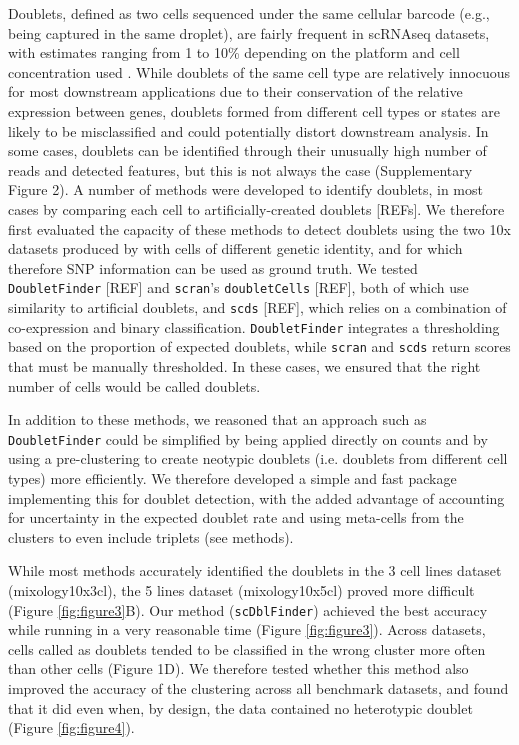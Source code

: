 \documentclass{bmcart}
\begin{document}
Doublets, defined as two cells sequenced under the same cellular barcode (e.g., being captured in the same droplet), are fairly frequent in scRNAseq datasets, with estimates ranging from 1 to 10\% depending on the platform and cell concentration used \citep{bloomEstimating2018,kangMultiplexedDemuxlet2018}. While doublets of the same cell type are relatively innocuous for most downstream applications due to their conservation of the relative expression between genes, doublets formed from different cell types or states are likely to be misclassified and could potentially distort downstream analysis. In some cases, doublets can be identified through their unusually high number of reads and detected features, but this is not always the case (Supplementary Figure 2). A number of methods were developed to identify doublets, in most cases by comparing each cell to artificially-created doublets [REFs]. We therefore first evaluated the capacity of these methods to detect doublets using the two 10x datasets produced by \citep{tianMixology2018} with cells of different genetic identity, and for which therefore SNP information can be used as ground truth. We tested \texttt{DoubletFinder} [REF] and \texttt{scran}'s \texttt{doubletCells} [REF], both of which use similarity to artificial doublets, and \texttt{scds} [REF], which relies on a combination of co-expression and binary classification. \texttt{DoubletFinder} integrates a thresholding based on the proportion of expected doublets, while \texttt{scran} and \texttt{scds} return scores that must be manually thresholded. In these cases, we ensured that the right number of cells would be called doublets.

In addition to these methods, we reasoned that an approach such as \texttt{DoubletFinder} could be simplified by being applied directly on counts and by using a pre-clustering to create neotypic doublets (i.e. doublets from different cell types) more efficiently. We therefore developed a simple and fast package implementing this for doublet detection, with the added advantage of accounting for uncertainty in the expected doublet rate and using meta-cells from the clusters to even include triplets (see methods).

While most methods accurately identified the doublets in the 3 cell lines dataset (mixology10x3cl), the 5 lines dataset (mixology10x5cl) proved more difficult (Figure \ref{fig:figure3}B). Our method (\texttt{scDblFinder}) achieved the best accuracy while running in a very reasonable time (Figure \ref{fig:figure3}). Across datasets, cells called as doublets tended to be classified in the wrong cluster more often than other cells (Figure 1D). We therefore tested whether this method also improved the accuracy of the clustering across all benchmark datasets, and found that it did even when, by design, the data contained no heterotypic doublet (Figure \ref{fig:figure4}).
\end{document}
